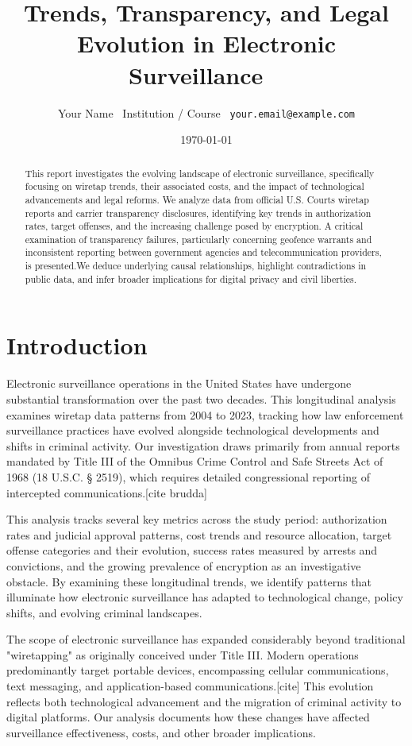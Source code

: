 \documentclass[11pt]{article}
\title{\textbf{Trends, Transparency, and Legal Evolution in Electronic Surveillance} \ \large }
\author{Your Name \
Institution / Course \
\texttt{your.email@example.com}
}
\date{\today}
\begin{document}
\maketitle

\begin{abstract}
This report investigates the evolving landscape of electronic surveillance, specifically focusing on wiretap trends, their associated costs, and the impact of technological advancements and legal reforms. We analyze data from official U.S. Courts wiretap reports and carrier transparency disclosures, identifying key trends in authorization rates, target offenses, and the increasing challenge posed by encryption. A critical examination of transparency failures, particularly concerning geofence warrants and inconsistent reporting between government agencies and telecommunication providers, is presented.We deduce underlying causal relationships, highlight contradictions in public data, and infer broader implications for digital privacy and civil liberties.
\end{abstract}

\section{Introduction}
\label{sec:introduction}
Electronic surveillance operations in the United States have undergone substantial transformation over the past two decades. This longitudinal analysis examines wiretap data patterns from 2004 to 2023, tracking how law enforcement surveillance practices have evolved alongside technological developments and shifts in criminal activity. Our investigation draws primarily from annual reports mandated by Title III of the Omnibus Crime Control and Safe Streets Act of 1968 (18 U.S.C. § 2519), which requires detailed congressional reporting of intercepted communications.[cite brudda]


This analysis tracks several key metrics across the study period: authorization rates and judicial approval patterns, cost trends and resource allocation, target offense categories and their evolution, success rates measured by arrests and convictions, and the growing prevalence of encryption as an investigative obstacle. By examining these longitudinal trends, we identify patterns that illuminate how electronic surveillance has adapted to technological change, policy shifts, and evolving criminal landscapes.

The scope of electronic surveillance has expanded considerably beyond traditional "wiretapping" as originally conceived under Title III. Modern operations predominantly target portable devices, encompassing cellular communications, text messaging, and application-based communications.[cite] This evolution reflects both technological advancement and the migration of criminal activity to digital platforms. Our analysis documents how these changes have affected surveillance effectiveness, costs, and other broader implications.
\end{document}
